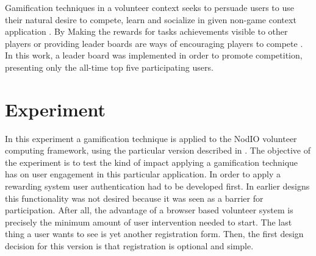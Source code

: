 \documentclass{llncs}
\begin{document}
Gamification techniques in a volunteer context seeks to persuade
users to use their natural desire to compete, learn and socialize in
given non-game context application \cite{deterding2011game,hamari2014does}.
By Making the rewards for  tasks achievements visible to other players or
providing leader boards are ways of encouraging players to compete
\cite{hickman2010total}. In this work, a leader board was implemented
in order to promote competition, presenting only the all-time top five
participating users.




\section{Experiment}
\label{sec:experiments}

In this experiment a gamification technique is applied to
the {\sf NodIO}
volunteer computing framework, using the
particular version described in \cite{DBLP:conf/gecco/MereloCGCRV16,2016arXiv160101607M}.
The objective of the experiment is to test the kind of impact
applying a gamification technique has on user engagement in this
particular application. In order to apply a rewarding system
user authentication had to be developed first. In earlier designs
this functionality was not desired because it was seen as a barrier
for participation. After all, the advantage of a browser based volunteer system
is precisely the minimum amount of user intervention needed to start.
The last thing a user wants to see is yet another registration form.
Then, the first design decision for this version is that registration
is optional and simple.
\end{document}
